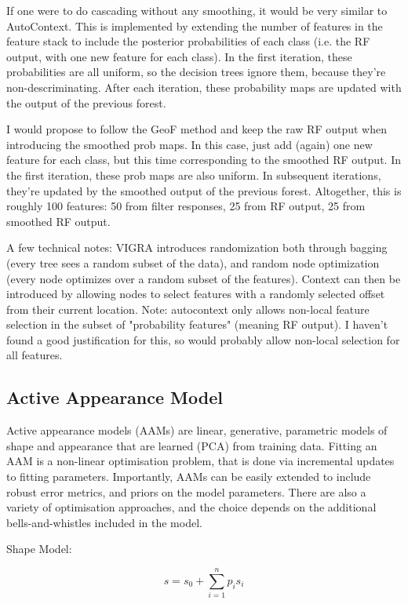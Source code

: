 \documentclass[10pt,twocolumn,letterpaper]{article}
\begin{document}
If one were to do cascading without any smoothing, it would be very similar to AutoContext.  This is implemented by extending the number of features in the feature stack to include the posterior probabilities of each class (i.e. the RF output, with one new feature for each class).  In the first iteration, these probabilities are all uniform, so the decision trees ignore them, because they're non-descriminating.  After each iteration, these probability maps are updated with the output of the previous forest.

I would propose to follow the GeoF method and keep the raw RF output when introducing the smoothed prob maps.  In this case, just add (again) one new feature for each class, but this time corresponding to the smoothed RF output.  In the first iteration, these prob maps are also uniform.  In subsequent iterations, they're updated by the smoothed output of the previous forest.  Altogether, this is roughly 100 features: 50 from filter responses, 25 from RF output, 25 from smoothed RF output.

A few technical notes: VIGRA introduces randomization both through bagging (every tree sees a random subset of the data), and random node optimization (every node optimizes over a random subset of the features).  Context can then be introduced by allowing nodes to select features with a randomly selected offset from their current location.  Note: autocontext only allows non-local feature selection in the subset of "probability features" (meaning RF output).  I haven't found a good justification for this, so would probably allow non-local selection for all features.

\subsection{Active Appearance Model}

Active appearance models (AAMs) are linear, generative, parametric models of shape and appearance that are learned (PCA) from training data.  Fitting an AAM is a non-linear optimisation problem, that is done via incremental updates to fitting parameters.  Importantly, AAMs can be easily extended to include robust error metrics, and priors on the model parameters.  There are also a variety of optimisation approaches, and the choice depends on the additional bells-and-whistles included in the model.

Shape Model:

\[s = s_0 + \sum_{i=1}^n p_i s_i\]
\end{document}
